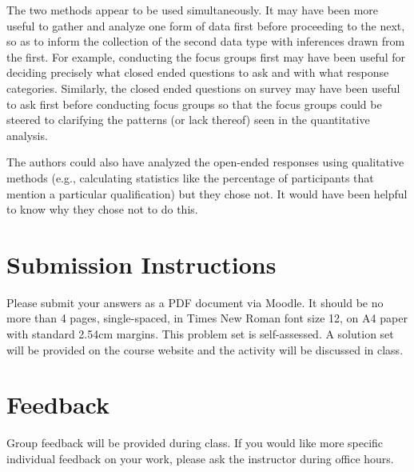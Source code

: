 \documentclass[a4paper]{exam}
\begin{document}
\begin{enumerate}
\begin{solution}
The two methods appear to be used simultaneously. It may have been more useful to gather and analyze one form of data first before proceeding to the next, so as to inform the collection of the second data type with inferences drawn from the first. For example, conducting the focus groups first may have been useful for deciding precisely what closed ended questions to ask and with what response categories. Similarly, the closed ended questions on survey may have been useful to ask first before conducting focus groups so that the focus groups could be steered to clarifying the patterns (or lack thereof) seen in the quantitative analysis.

The authors could also have analyzed the open-ended responses using qualitative methods (e.g., calculating statistics like the percentage of participants that mention a particular qualification) but they chose not. It would have been helpful to know why they chose not to do this.

\end{solution}

\end{enumerate}

\section{Submission Instructions}\label{submission-instructions}

Please submit your answers as a PDF document via Moodle. It should be no more than 4 pages, single-spaced, in Times New Roman font size 12, on A4 paper with standard 2.54cm margins. This problem set is self-assessed. A solution set will be provided on the course website and the activity will be discussed in class.

\section{Feedback}\label{feedback}

Group feedback will be provided during class. If you would like more specific individual feedback on your work, please ask the instructor during office hours.
\end{document}
